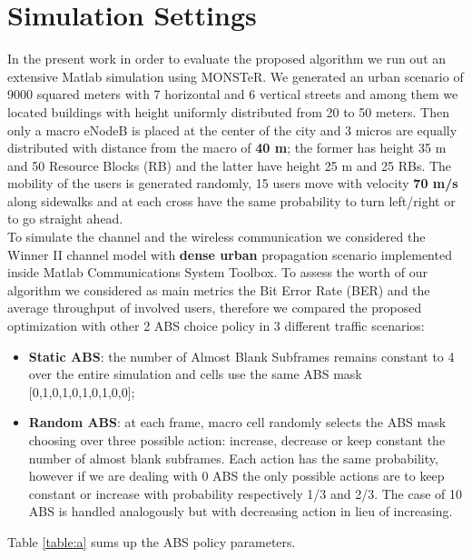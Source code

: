 \documentclass[conference,10pt]{IEEEtran}
\begin{document}
\section{Simulation Settings}
In the present work in order to evaluate the proposed algorithm we run out an extensive Matlab simulation using MONSTeR. We generated an urban scenario of 9000 squared meters with 7 horizontal and 6 vertical streets and among them we located buildings with height uniformly distributed from 20 to 50 meters. Then only a macro eNodeB is placed at the center of the city and 3 micros are equally distributed with distance from the macro of \textbf{40 m}; the former has height 35 m and 50 Resource Blocks (RB) and the latter have height 25 m and 25 RBs. The mobility of the users is generated randomly, 15 users move with velocity \textbf{70 m/s} along sidewalks and at each cross have the same probability to turn left/right or to go straight ahead.\\
To simulate the channel and the wireless communication we considered the Winner II channel model with \textbf{dense urban} propagation scenario implemented inside Matlab Communications System Toolbox.
To assess the worth of our algorithm we considered as main metrics the Bit Error Rate (BER) and the average throughput of involved users, therefore we compared the proposed optimization with other 2 ABS choice policy in 3 different traffic scenarios:
\begin{itemize}
	\item \textbf{Static ABS}: the number of Almost Blank Subframes remains constant to 4 over the entire simulation and  cells use the same ABS mask 
    [0,1,0,1,0,1,0,1,0,0];
    \item \textbf{Random ABS}:  at each frame, macro cell randomly selects the ABS mask choosing over three possible action: increase, decrease or keep constant the number of almost blank subframes. Each action has the same probability, however if we are dealing with 0 ABS the only possible actions are to keep constant or increase with probability respectively 1/3 and 2/3. The case of 10 ABS is handled analogously but with decreasing action in lieu of increasing.
\end{itemize}
Table \ref{table:a} sums up the ABS policy parameters.
\end{document}
